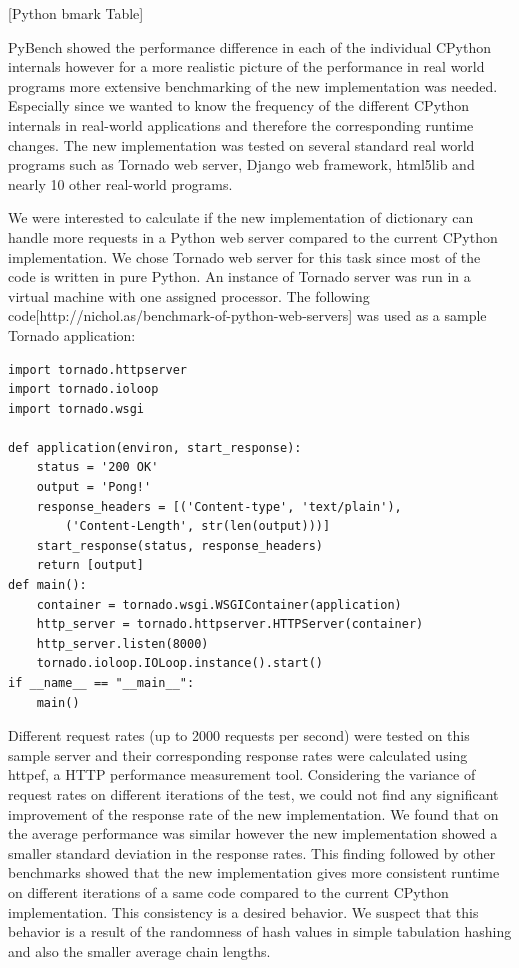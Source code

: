 \documentclass[12pt]{article}
\begin{document}
[Python bmark Table]  
 

PyBench showed the performance difference in each of the individual CPython internals however for a more realistic picture of the performance in real world programs more extensive benchmarking of the new implementation was needed. Especially since we wanted to know the frequency of the different CPython internals in real-world applications and therefore the corresponding runtime changes. The new implementation was tested on several standard real world programs such as Tornado web server, Django web framework, html5lib and nearly 10 other real-world programs. 

We were interested to calculate if the new implementation of dictionary can handle more requests in a Python web server compared to the current CPython implementation. We chose Tornado web server for this task since most of the code is written in pure Python. An instance of Tornado server was run in a virtual machine with one assigned processor. The following code[http://nichol.as/benchmark-of-python-web-servers] was used as a sample Tornado application:
 \begin{verbatim}
import tornado.httpserver
import tornado.ioloop
import tornado.wsgi

def application(environ, start_response):
    status = '200 OK'
    output = 'Pong!' 
    response_headers = [('Content-type', 'text/plain'),
        ('Content-Length', str(len(output)))]
    start_response(status, response_headers)
    return [output]
def main():
    container = tornado.wsgi.WSGIContainer(application)
    http_server = tornado.httpserver.HTTPServer(container)
    http_server.listen(8000)
    tornado.ioloop.IOLoop.instance().start()
if __name__ == "__main__":
    main()
 \end{verbatim}

Different request rates (up to 2000 requests per second) were tested on this sample server and their corresponding response rates were calculated using httpef, a HTTP performance measurement tool. Considering the variance of request rates on different iterations of the test, we could not find any significant improvement of the response rate of the new implementation. We found that on the average performance was similar however the new implementation showed a smaller standard deviation in the response rates. This finding followed by other benchmarks showed that the new implementation gives more consistent runtime on different iterations of a same code compared to the current CPython implementation. This consistency is a desired behavior. We suspect that this behavior is a result of the randomness of hash values in simple tabulation hashing and also the smaller average chain lengths.
\end{document}
